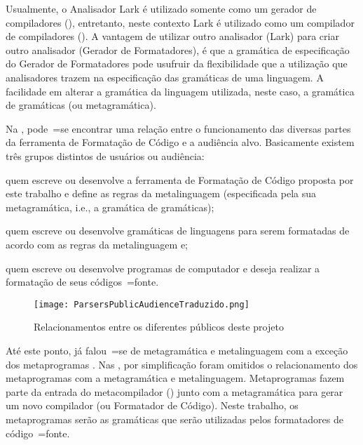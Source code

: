 Usualmente,
o Analisador Lark é utilizado somente como um gerador de compiladores (),
entretanto,
neste contexto Lark é utilizado como um compilador de compiladores ().
A vantagem de utilizar outro analisador (Lark) para criar outro analisador (Gerador de Formatadores),
é que a gramática de especificação do Gerador de Formatadores pode usufruir da flexibilidade que a utilização que analisadores trazem na especificação das gramáticas de uma linguagem.
A facilidade em alterar a gramática da linguagem utilizada,
neste caso,
a gramática de gramáticas (ou metagramática).

Na ,
pode~=se encontrar uma relação entre o funcionamento das diversas partes da ferramenta de Formatação de Código e
a audiência alvo.
Basicamente existem três grupos distintos de usuários ou
audiência:
\begin{inparaenum}[1)]
\item quem escreve ou
desenvolve a ferramenta de Formatação de Código proposta por este trabalho e
define as regras da metalinguagem (especificada pela sua metagramática,
i.e.,
a gramática de gramáticas);
\item quem escreve ou
desenvolve gramáticas de linguagens para serem formatadas de acordo com as regras da metalinguagem e;
\item quem escreve ou
desenvolve programas de computador e
deseja realizar a formatação de seus códigos~=fonte.
\end{inparaenum}%
\begin{figure}[!htb]
\caption{Relacionamentos entre os diferentes públicos deste projeto}
\label{figure:ParsersPublicAudienceTraduzido}
\centering
\texttt{[image: ParsersPublicAudienceTraduzido.png]}
\end{figure}

Até este ponto,
já falou~=se de metagramática e
metalinguagem com a exceção dos metaprogramas \cite{tradeoffsInMetaprogramming}.
Nas ,
por simplificação foram omitidos o relacionamento dos metaprogramas com a metagramática e
metalinguagem.
Metaprogramas fazem parte da entrada do metacompilador () junto com a metagramática para gerar um novo compilador (ou Formatador de Código).
Neste trabalho,
os metaprogramas serão as gramáticas que serão utilizadas pelos formatadores de código~=fonte.

